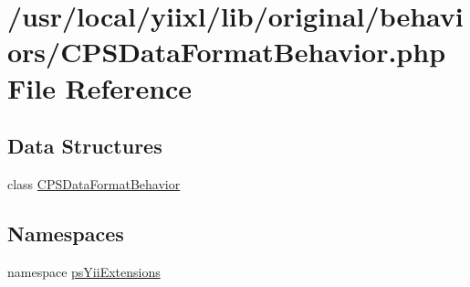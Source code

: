 \hypertarget{CPSDataFormatBehavior_8php}{
\section{/usr/local/yiixl/lib/original/behaviors/CPSDataFormatBehavior.php File Reference}
\label{CPSDataFormatBehavior_8php}
}
\subsection*{Data Structures}
\begin{DoxyCompactItemize}
\item 
class \hyperlink{classCPSDataFormatBehavior}{CPSDataFormatBehavior}
\end{DoxyCompactItemize}
\subsection*{Namespaces}
\begin{DoxyCompactItemize}
\item 
namespace \hyperlink{namespacepsYiiExtensions}{psYiiExtensions}
\end{DoxyCompactItemize}
